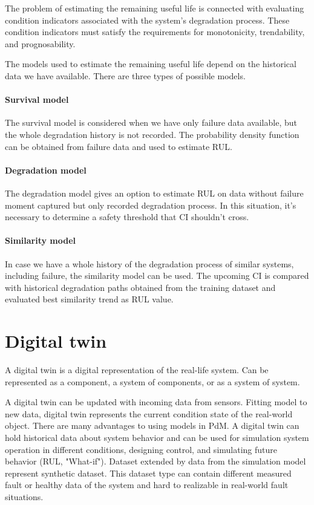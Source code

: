 The problem of estimating the remaining useful life is connected with
evaluating condition indicators associated with the system's degradation
process. These condition indicators must satisfy the requirements for
monotonicity, trendability, and prognosability.

The models used to estimate the remaining useful life depend on the
historical data we have available. There are three types of possible
models. 

\paragraph{Survival model}
The survival model is considered when we have only failure data available,
but the whole degradation history is not recorded. The probability density
function can be obtained from failure data and used to estimate RUL.

\paragraph{Degradation model}
The degradation model gives an option to estimate RUL on data without
failure moment captured but only recorded degradation process. In this
situation, it's necessary to determine a safety threshold that CI shouldn't
cross.

\paragraph{Similarity model}
In case we have a whole history of the degradation process of similar
systems, including failure, the similarity model can be used. The upcoming
CI is compared with historical degradation paths obtained from the training
dataset and evaluated best similarity trend as RUL value.


\section{Digital twin}\label{sec:digital_twin}

A digital twin is a digital representation of the real-life system. Can be
represented as a component, a system of components, or as a system of
system. 

A digital twin can be updated with incoming data from sensors.
Fitting model to new data, digital twin represents the current condition
state of the real-world object.  There are many advantages to using models
in PdM. A digital twin can hold historical data about system behavior and
can be used for simulation system operation in different conditions,
designing control, and simulating future behavior (RUL, "What-if"). Dataset
extended by data from the simulation model represent synthetic dataset.
This dataset type can contain different measured fault or healthy data of
the system and hard to realizable in real-world fault situations. 

